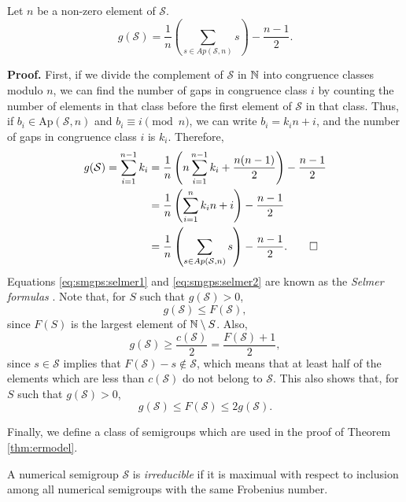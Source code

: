 \begin{proposition} Let $n$ be a non-zero element of $\mathcal{S}$. 
    \begin{equation}\label{eq:smgps:selmer2}
        g(\mathcal{S}) = \frac{1}{n}\left(\sum_{s \in Ap(\mathcal{S}, n)} s\right) - \frac{n - 1}{2}.
    \end{equation}
\end{proposition}
\textbf{Proof. } First, if we divide the complement of $\mathcal{S}$ in $\mathbb{N}$ into congruence classes modulo $n$, we can find the number of gaps in congruence class $i$ by counting the number of elements in that class before the first element of $\mathcal{S}$ in that class. Thus, if $b_i \in \mathrm{Ap}(\mathcal{S}, n)$ and $b_i \equiv i \pmod n$, we can write $b_i = k_i n + i$, and the number of gaps in congruence class $i$ is $k_i$. Therefore,
\begin{align*}
    g(\mathcal{S}) = \sum_{i = 1}^{n - 1} k_i &=  \frac{1}{n}\left(n\sum_{i = 1}^{n - 1} k_i + \frac{n(n - 1)}{2}\right) - \frac{n - 1}{2} \\
    &= \frac{1}{n}\left(\sum_{i = 1}^n k_i n + i \right) - \frac{n - 1}{2} \\
    &= \frac{1}{n}\left(\sum_{s \in Ap(\mathcal{S}, n)} s \right) - \frac{n - 1}{2}. \qed
\end{align*}
Equations \ref{eq:smgps:selmer1} and \ref{eq:smgps:selmer2} are known as the \textit{Selmer formulas} \cite{selmer1977linear}. Note that, for $S$ such that $g(\mathcal{S}) > 0$,
\[g(\mathcal{S}) \leq F(\mathcal{S}),\] 
since $F(S)$ is the largest element of $\mathbb{N} \setminus S$. Also, 
\[g(\mathcal{S}) \geq \frac{c(\mathcal{S})}{2} = \frac{F(\mathcal{S}) + 1}{2},\]
since $s \in \mathcal{S}$ implies that $F(\mathcal{S}) - s \notin \mathcal{S}$, which means that at least half of the elements which are less than $c(\mathcal{S})$ do not belong to $\mathcal{S}$.  This also shows that, for $S$ such that $g(\mathcal{S}) > 0$, 
\begin{equation}\label{eq:smgps:frobgenus}
    g(\mathcal{S}) \leq F(\mathcal{S}) \leq 2g(\mathcal{S}).
\end{equation}

Finally, we define a class of semigroups which are used in the proof of Theorem \ref{thm:ermodel}. 

\begin{definition}\label{def:smgps:irreducible}
    A numerical semigroup $\mathcal{S}$ is \textit{irreducible} if it is maximual with respect to inclusion among all numerical semigroups with the same Frobenius number.
\end{definition}


